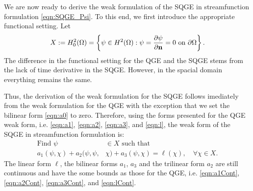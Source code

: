 We are now ready to derive the weak formulation of the SQGE in streamfunction
formulation \eqref{eqn:SQGE_Psi}. To this end, we first introduce the
appropriate functional setting. Let
\begin{equation*}
  X := H^2_0(\Omega) = \left\{ \psi\in H^2(\Omega): \psi=\frac{\partial\psi}{\partial {\bf n}}=0
    \text{ on } \partial\Omega \right\} .
\end{equation*}
The difference in the functional setting for the QGE and the SQGE stems from the
lack of time derivative in the SQGE. However, in the spacial domain everything
remains the same.

Thus, the derivation of the weak formulation for the SQGE follows imediately
from the weak formulation for the QGE with the exception that we set the
bilinear form \eqref{eqn:a0} to zero. Therefore, using the forms presented for
the QGE weak form, i.e.  \eqref{eqn:a1}, \eqref{eqn:a2}, \eqref{eqn:a3}, and
\eqref{eqn:l}, the weak form of the SQGE in streamfunction formulation is:
\begin{equation}
  \begin{split}
    \text{Find }\psi &\in X \text{ such that} \\
    a_1(\psi,\chi) + a_2(\psi,\psi,&\chi) + a_3(\psi,\chi)
    = \ell(\chi),\quad \forall \chi \in X.
  \end{split}
  \label{eqn:SQGEWF}
\end{equation}
The linear form $\ell$, the bilinear forms $a_1$, $a_3$ and the trilinear form
$a_2$ are still continuous \cite{Cayco86} and have the some bounds as those for
the QGE, i.e.  \eqref{eqn:a1Cont}, \eqref{eqn:a2Cont}, \eqref{eqn:a3Cont}, and
\eqref{eqn:lCont}.


